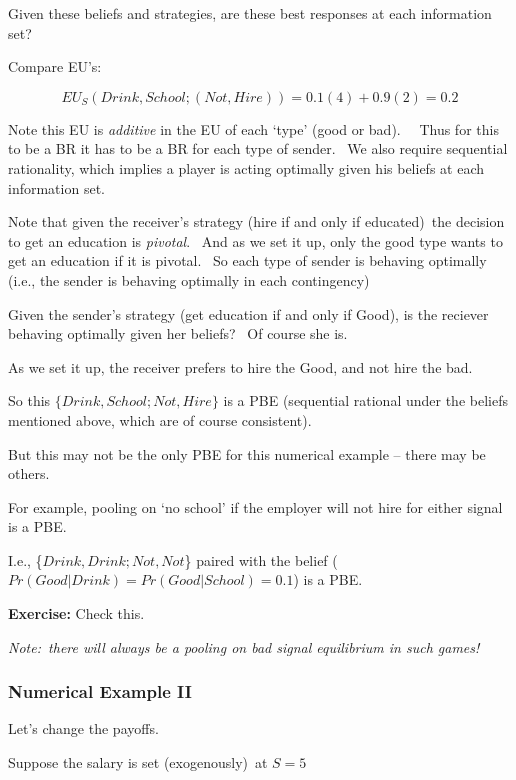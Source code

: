 \documentclass{article}
\begin{document}
\bigskip

Given these beliefs and strategies, are these best responses at each
information set?

\bigskip

Compare EU's:

\[
EU_{S}(Drink,School;(Not,Hire))=0.1(4)+0.9(2)=0.2 
\]

Note this EU is \textit{additive} in the EU of each `type' (good or bad). \
\ Thus for this to be a BR it has to be a BR for each type of sender. \ We
also require sequential rationality, which implies a player is acting
optimally given his beliefs at each information set.

\bigskip 

Note that given the receiver's strategy (hire if and only if educated)\ the
decision to get an education is \textit{pivotal}. \ And as we set it up,
only the good type wants to get an education if it is pivotal. \ So each
type of sender is behaving optimally (i.e., the sender is behaving optimally
in each contingency)\bigskip 

Given the sender's strategy (get education if and only if Good), is the
reciever behaving optimally given her beliefs? \ Of course she is. \ 

As we set it up, the receiver prefers to hire the Good, and not hire the
bad. \ 

So this $\{Drink,School;Not,Hire\}$ is a PBE (sequential rational under the
beliefs mentioned above, which are of course consistent).

\bigskip

But this may not be the only PBE for this numerical example -- there may be
others. \ 

For example, pooling on `no school' if the employer will not hire for either
signal is a PBE.

I.e., \{$Drink,Drink;Not,Not$\} paired with the belief ($%
Pr(Good|Drink)=Pr(Good|School)=0.1$) is a PBE.

\textbf{Exercise: }Check this.

\textit{Note:\ there will always be a pooling on bad signal equilibrium in
such games!}\bigskip

\subsubsection{Numerical Example II}

Let's change the payoffs.

Suppose the salary is set (exogenously)\ at $S=5$
\end{document}
